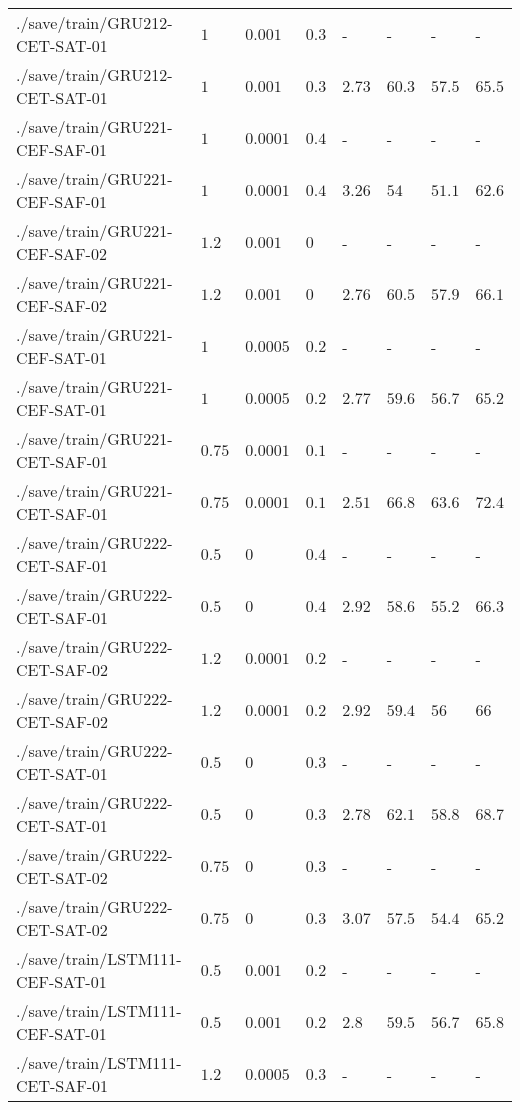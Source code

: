 \begin{table}[tbp]
\begin{tabular}{llllllll}
./save/train/GRU212-CET-SAT-01 & $1$ & $0.001$ & $0.3$ & - & - & - & - \\
./save/train/GRU212-CET-SAT-01 & $1$ & $0.001$ & $0.3$ & $2.73$ & $60.3$ & $57.5$ & $65.5$ \\
./save/train/GRU221-CEF-SAF-01 & $1$ & $0.0001$ & $0.4$ & - & - & - & - \\
./save/train/GRU221-CEF-SAF-01 & $1$ & $0.0001$ & $0.4$ & $3.26$ & $54$ & $51.1$ & $62.6$ \\
./save/train/GRU221-CEF-SAF-02 & $1.2$ & $0.001$ & $0$ & - & - & - & - \\
./save/train/GRU221-CEF-SAF-02 & $1.2$ & $0.001$ & $0$ & $2.76$ & $60.5$ & $57.9$ & $66.1$ \\
./save/train/GRU221-CEF-SAT-01 & $1$ & $0.0005$ & $0.2$ & - & - & - & - \\
./save/train/GRU221-CEF-SAT-01 & $1$ & $0.0005$ & $0.2$ & $2.77$ & $59.6$ & $56.7$ & $65.2$ \\
./save/train/GRU221-CET-SAF-01 & $0.75$ & $0.0001$ & $0.1$ & - & - & - & - \\
./save/train/GRU221-CET-SAF-01 & $0.75$ & $0.0001$ & $0.1$ & $2.51$ & $66.8$ & $63.6$ & $72.4$ \\
./save/train/GRU222-CET-SAF-01 & $0.5$ & $0$ & $0.4$ & - & - & - & - \\
./save/train/GRU222-CET-SAF-01 & $0.5$ & $0$ & $0.4$ & $2.92$ & $58.6$ & $55.2$ & $66.3$ \\
./save/train/GRU222-CET-SAF-02 & $1.2$ & $0.0001$ & $0.2$ & - & - & - & - \\
./save/train/GRU222-CET-SAF-02 & $1.2$ & $0.0001$ & $0.2$ & $2.92$ & $59.4$ & $56$ & $66$ \\
./save/train/GRU222-CET-SAT-01 & $0.5$ & $0$ & $0.3$ & - & - & - & - \\
./save/train/GRU222-CET-SAT-01 & $0.5$ & $0$ & $0.3$ & $2.78$ & $62.1$ & $58.8$ & $68.7$ \\
./save/train/GRU222-CET-SAT-02 & $0.75$ & $0$ & $0.3$ & - & - & - & - \\
./save/train/GRU222-CET-SAT-02 & $0.75$ & $0$ & $0.3$ & $3.07$ & $57.5$ & $54.4$ & $65.2$ \\
./save/train/LSTM111-CEF-SAT-01 & $0.5$ & $0.001$ & $0.2$ & - & - & - & - \\
./save/train/LSTM111-CEF-SAT-01 & $0.5$ & $0.001$ & $0.2$ & $2.8$ & $59.5$ & $56.7$ & $65.8$ \\
./save/train/LSTM111-CET-SAF-01 & $1.2$ & $0.0005$ & $0.3$ & - & - & - & - \\

\end{tabular}
\end{table}
